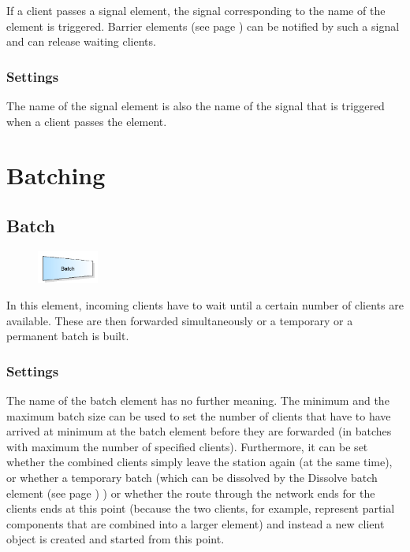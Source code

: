 If a client passes a signal element, the signal corresponding to the name of the element is triggered.
Barrier elements (see page \pageref{ref:ModelElementBarrier}) can be notified by such a signal and can release waiting clients.

\subsection*{Settings}

The name of the signal element is also the name of the signal that is triggered when a client passes the element.





\chapter{Batching}

\section{Batch}
\label{ref:ModelElementBatch}

\begin{figure}
\vspace{-22pt}
\includegraphics[width=2cm]{imageModelElementBatch.png}
\vspace{-22pt}
\end{figure}

In this element, incoming clients have to wait until a certain number of clients are available.
These are then forwarded simultaneously or a temporary or a permanent batch is built.

\subsection*{Settings}

The name of the batch element has no further meaning. The minimum and the maximum batch size can be used
to set the number of clients that have to have arrived at minimum at the batch element before they are
forwarded (in batches with maximum the number of specified clients). Furthermore, it can be set whether
the combined clients simply leave the station again (at the same time), or whether a temporary batch (which
can be dissolved by the Dissolve batch element (see page \pageref{ref:ModelElementSeparate}) ) or whether the route
through the network ends for the clients ends at this point (because the two clients, for example, represent
partial components that are combined into a larger element) and instead a new client object is created and
started from this point.


